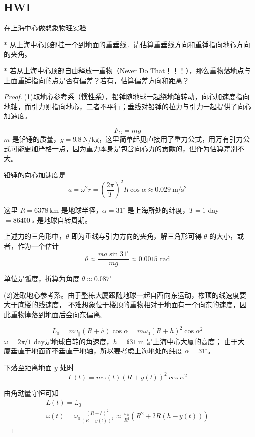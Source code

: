 \subsection{HW1}
\begin{1}
    在上海中心做想象物理实验

* 从上海中心顶部挂一个到地面的重垂线，请估算重垂线方向和重锤指向地心方向的夹角。

* 若从上海中心顶部自由释放一重物（Never Do That！！！），那么重物落地点与上面重锤指向的点是否有偏差？若有，估算偏差方向和距离？

\end{1}
\begin{proof}
    (1)取地心参考系（惯性系），铅锤随地球一起绕地轴转动，向心加速度指向地轴，而引力则指向地心，二者不平行；垂线对铅锤的拉力与引力一起提供了向心加速度。

$$F_{G}=m g$$
$m$ 是铅锤的质量，$g=9.8 \mathrm{~N} / \mathrm{kg}$，这里简单起见直接用了重力公式，用万有引力公式可能更加严格一点，因为重力本身是包含向心力的贡献的，但作为估算差别不大。

铅锤的向心加速度是
$$a=\omega^{2} r=\left(\frac{2 \pi}{T}\right)^{2} R \cos \alpha 
\approx 0.029 \mathrm{~m} / \mathrm{s}^{2}$$

这里 $R=6378 \mathrm{~km}$ 是地球半径，$\alpha=31^{\circ}$ 是上海所处的纬度，$T=1$ day $=86400 \mathrm{~s}$ 是地球自转周期。

上述力的三角形中，$\theta$ 即为垂线与引力方向的夹角，解三角形可得 $\theta$ 的大小，或者，作为一个估计
$$\theta \approx \frac{m a \sin 31^{\circ}}{m g} \approx 0.0015 \text{ rad}$$

单位是弧度，折算为角度 $\theta \approx 0.087^{\circ}$



(2)选取地心参考系。由于整栋大厦跟随地球一起自西向东运动，楼顶的线速度要大于底楼的线速度，
不难想象位于楼顶的重物相对于地面有一个向东的速度，因此重物掉落到地面后会向东偏离。

$$L_{0}=m v_{\|}(R+h) \cos \alpha=m \omega_{0}(R+h)^{2} \cos \alpha^{2}$$
$\omega=2 \pi / 1$ day是地球自转的角速度，$h=631 \mathrm{~m}$ 是上海中心大厦的高度；
由于大厦垂直于地面而不垂直于地轴，所以要考虑上海地处的纬度 $\alpha=31^{\circ}$。

下落至距离地面 $y$ 处时
$$L(t)=m \omega(t)(R+y(t))^{2} \cos \alpha^{2}$$

由角动量守恒可知
$$
\begin{gathered}
L(t)=L_{0} \\
\omega(t)=\omega_{0} \frac{(R+h)^{2}}{(R+y(t))^{2}} \approx \frac{\omega_{0}}{R^{2}}\left(R^{2}+2 R(h-y(t))\right)
\end{gathered}
$$


\end{proof}
